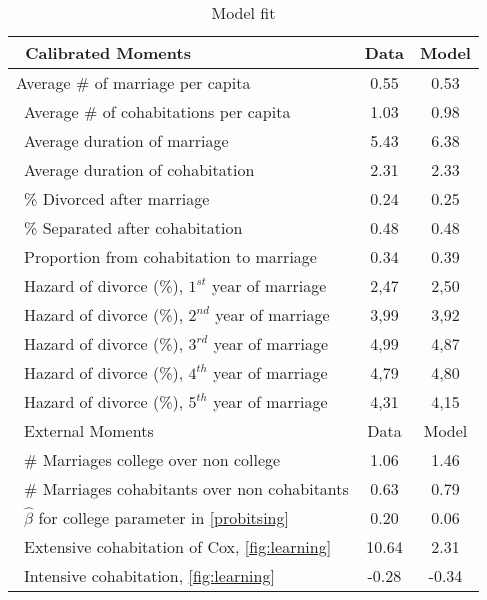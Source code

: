 \documentclass[12pt]{article}
\begin{document}
\begin{table}[H]
	\caption{Model fit} %
	\centering %
	\begin{tabular}{@{} l c c @{}}  %
		\hline\hline %
		\ Calibrated Moments & Data  & Model \\ [0.05ex] %
		\hline %
		\rule{0pt}{2.5ex}
	Average \# of marriage per capita                       & 0.55 &  0.53 \\[0.15ex]
		\ Average \# of cohabitations per capita            & 1.03 &  0.98 \\[0.15ex]
		\ Average duration of marriage                      & 5.43 &  6.38 \\[0.15ex]		
		\ Average duration of cohabitation                  & 2.31 &  2.33 \\[0.15ex]
		\ \% Divorced after marriage                        & 0.24 &  0.25 \\[0.15ex]
		\ \% Separated after cohabitation                   & 0.48 &  0.48 \\[0.15ex]
		\ Proportion from cohabitation to marriage          & 0.34 &  0.39 \\[0.15ex]
		\ Hazard of divorce (\%), $1^{st}$ year of marriage & 2,47 &  2,50 \\[0.15ex]
		\ Hazard of divorce (\%), $2^{nd}$ year of marriage & 3,99 &  3,92 \\[0.15ex]
		\ Hazard of divorce (\%), $3^{rd}$ year of marriage & 4,99 &  4,87 \\[0.15ex]
		\ Hazard of divorce (\%), $4^{th}$ year of marriage & 4,79 &  4,80 \\[0.15ex]
		\ Hazard of divorce (\%), $5^{th}$ year of marriage & 4,31 &  4,15 \\[0.15ex]
		\hline \hline%
		\ External Moments & Data  & Model   \\ [0.05ex] %
		\hline
		\ \# Marriages college over non college                          & 1.06 & 1.46  \\[0.15ex]
		\ \# Marriages cohabitants over non cohabitants                  & 0.63 & 0.79   \\[0.15ex]
		\ $\hat{\beta}$ for college parameter in \autoref{probitsing}    & 0.20 & 0.06 \\[0.15ex]
		\ Extensive cohabitation of Cox, \autoref{fig:learning}          & 10.64 & 2.31   \\[0.15ex]
		\ Intensive cohabitation, \autoref{fig:learning}                 & -0.28 & -0.34  \\[0.15ex]
		\hline
	\end{tabular}
	\label{table:fit} %
\end{table}
\newpage
\end{document}
